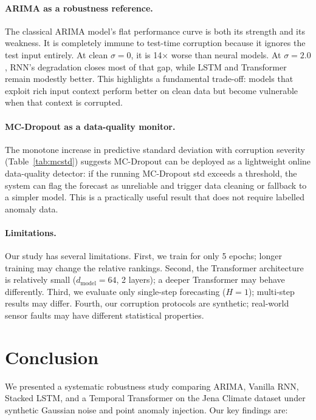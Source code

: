 \documentclass[runningheads]{llncs}
\begin{document}
\paragraph{ARIMA as a robustness reference.}
The classical ARIMA model's flat performance curve is both its strength and its weakness. It is completely immune to test-time corruption because it ignores the test input entirely. At clean $\sigma=0$, it is 14$\times$ worse than neural models. At $\sigma=2.0$, RNN's degradation closes most of that gap, while LSTM and Transformer remain modestly better. This highlights a fundamental trade-off: models that exploit rich input context perform better on clean data but become vulnerable when that context is corrupted.

\paragraph{MC-Dropout as a data-quality monitor.}
The monotone increase in predictive standard deviation with corruption severity (Table~\ref{tab:mcstd}) suggests MC-Dropout can be deployed as a lightweight online data-quality detector: if the running MC-Dropout std exceeds a threshold, the system can flag the forecast as unreliable and trigger data cleaning or fallback to a simpler model. This is a practically useful result that does not require labelled anomaly data.

\paragraph{Limitations.}
Our study has several limitations. First, we train for only 5 epochs; longer training may change the relative rankings. Second, the Transformer architecture is relatively small ($d_\text{model}=64$, 2 layers); a deeper Transformer may behave differently. Third, we evaluate only single-step forecasting ($H=1$); multi-step results may differ. Fourth, our corruption protocols are synthetic; real-world sensor faults may have different statistical properties.

\section{Conclusion}
\label{sec:conclusion}

We presented a systematic robustness study comparing ARIMA, Vanilla RNN, Stacked LSTM, and a Temporal Transformer on the Jena Climate dataset under synthetic Gaussian noise and point anomaly injection. Our key findings are:
\end{document}
